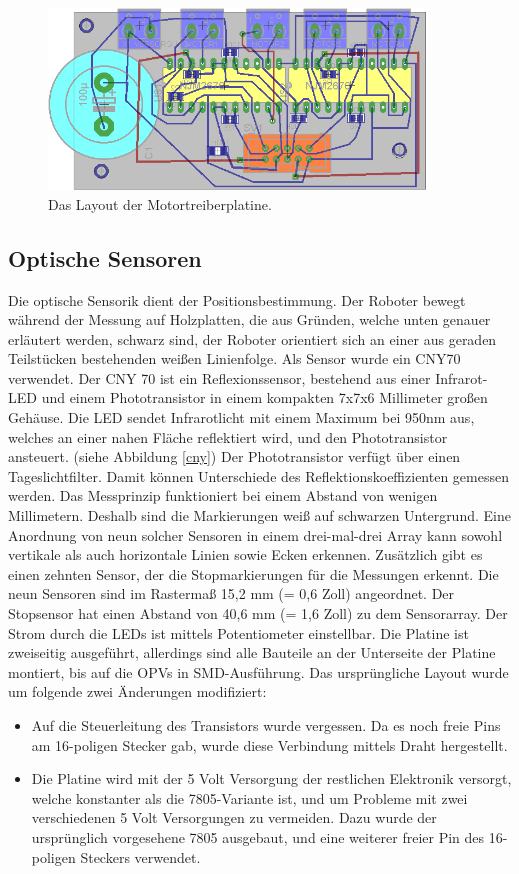 \documentclass[a4paper,bibtotoc,oneside]{scrbook}
\begin{document}
\begin{figure}[htbp]
\centering
\includegraphics[width=100mm]{img/hdrive.png}
\caption{Das Layout der Motortreiberplatine.}\label{hbridge2}
\end{figure}

\FloatBarrier

\subsection{Optische Sensoren}\thispagestyle{empty}
Die optische Sensorik dient der Positionsbestimmung. Der Roboter bewegt während der Messung auf Holzplatten, die aus Gründen, welche unten genauer erläutert werden, schwarz sind, der Roboter orientiert sich an einer aus geraden Teilstücken bestehenden weißen Linienfolge. 
Als Sensor wurde ein CNY70 \cite{cny} verwendet. Der CNY 70 ist ein Reflexionssensor, bestehend aus einer Infrarot-LED und einem Phototransistor in einem kompakten 7x7x6 Millimeter großen Gehäuse. Die LED sendet Infrarotlicht mit einem Maximum bei 950nm aus, welches an einer nahen Fläche reflektiert wird, und den Phototransistor ansteuert. (siehe Abbildung \ref{cny}) Der Phototransistor verfügt über einen Tageslichtfilter. Damit können Unterschiede des Reflektionskoeffizienten gemessen werden. Das Messprinzip funktioniert bei einem Abstand von wenigen Millimetern.  Deshalb sind die Markierungen weiß auf schwarzen Untergrund. Eine Anordnung von neun solcher Sensoren in einem drei-mal-drei Array kann sowohl vertikale als auch horizontale Linien sowie Ecken erkennen. Zusätzlich gibt es einen zehnten Sensor, der die Stopmarkierungen für die Messungen erkennt.
Die neun Sensoren sind im Rastermaß 15,2 mm (= 0,6 Zoll) angeordnet. Der Stopsensor hat einen Abstand von 40,6 mm (= 1,6 Zoll) zu dem Sensorarray. 
Der Strom durch die LEDs ist mittels Potentiometer einstellbar. 
Die Platine ist zweiseitig ausgeführt, allerdings sind alle Bauteile an der Unterseite der Platine montiert, bis auf die OPVs in SMD-Ausführung. Das ursprüngliche Layout wurde um folgende zwei Änderungen modifiziert:
\begin{itemize}
\item Auf die Steuerleitung des Transistors wurde vergessen. Da es noch freie Pins am 16-poligen Stecker gab, wurde diese Verbindung mittels Draht hergestellt.
\item Die Platine wird mit der 5 Volt Versorgung der restlichen Elektronik versorgt, welche konstanter als die 7805-Variante ist, und um Probleme mit zwei verschiedenen 5 Volt Versorgungen zu vermeiden. Dazu wurde der ursprünglich vorgesehene 7805 ausgebaut, und eine weiterer freier Pin des 16-poligen Steckers verwendet.
\end{itemize}
\end{document}
